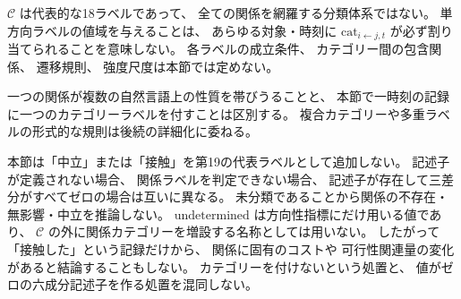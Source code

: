 \begin{remark}[カテゴリー集合の役割]
\label{rem:category_set_role}
$\mathcal C$ は代表的な18ラベルであって、
全ての関係を網羅する分類体系ではない。
単方向ラベルの値域を与えることは、
あらゆる対象・時刻に
$\mathrm{cat}_{i\leftarrow j,t}$ が必ず割り当てられることを意味しない。
各ラベルの成立条件、
カテゴリー間の包含関係、
遷移規則、
強度尺度は本節では定めない。

一つの関係が複数の自然言語上の性質を帯びうることと、
本節で一時刻の記録に一つのカテゴリーラベルを付すことは区別する。
複合カテゴリーや多重ラベルの形式的な規則は後続の詳細化に委ねる。
\end{remark}

\begin{remark}[中立カテゴリーの除外]
\label{rem:neutral_exclusion}
本節は「中立」または「接触」を第19の代表ラベルとして追加しない。
記述子が定義されない場合、
関係ラベルを判定できない場合、
記述子が存在して三差分がすべてゼロの場合は互いに異なる。
未分類であることから関係の不存在・無影響・中立を推論しない。
$\mathrm{undetermined}$ は方向性指標にだけ用いる値であり、
$\mathcal C$ の外に関係カテゴリーを増設する名称としては用いない。
したがって「接触した」という記録だけから、
関係に固有のコストや
可行性関連量の変化があると結論することもしない。
カテゴリーを付けないという処置と、
値がゼロの六成分記述子を作る処置を混同しない。
\end{remark}

